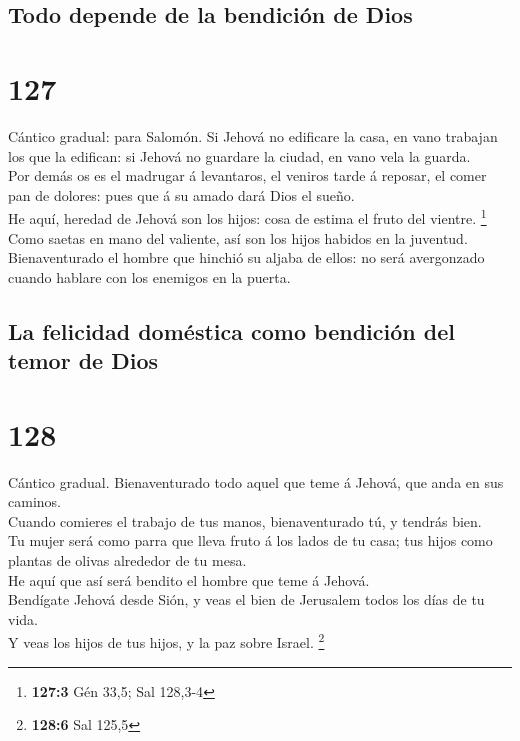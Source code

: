 \hypertarget{todo-depende-de-la-bendiciuxf3n-de-dios}{%
\subsection{Todo depende de la bendición de
Dios}\label{todo-depende-de-la-bendiciuxf3n-de-dios}}

\hypertarget{section-126}{%
\section{127}\label{section-126}}

 Cántico gradual: para Salomón. Si Jehová no edificare la
casa, en vano trabajan los que la edifican: si Jehová no guardare la
ciudad, en vano vela la guarda.\\
 Por demás os es el madrugar á levantaros, el veniros
tarde á reposar, el comer pan de dolores: pues que á su amado dará Dios
el sueño.\\
 He aquí, heredad de Jehová son los hijos: cosa de estima
el fruto del vientre. \footnote{\textbf{127:3} Gén 33,5; Sal 128,3-4}\\
 Como saetas en mano del valiente, así son los hijos
habidos en la juventud.\\
 Bienaventurado el hombre que hinchió su aljaba de ellos:
no será avergonzado cuando hablare con los enemigos en la puerta.

\hypertarget{la-felicidad-domuxe9stica-como-bendiciuxf3n-del-temor-de-dios}{%
\subsection{La felicidad doméstica como bendición del temor de
Dios}\label{la-felicidad-domuxe9stica-como-bendiciuxf3n-del-temor-de-dios}}

\hypertarget{section-127}{%
\section{128}\label{section-127}}

 Cántico gradual. Bienaventurado todo aquel que teme á
Jehová, que anda en sus caminos.\\
 Cuando comieres el trabajo de tus manos, bienaventurado
tú, y tendrás bien.\\
 Tu mujer será como parra que lleva fruto á los lados de
tu casa; tus hijos como plantas de olivas alrededor de tu mesa.\\
 He aquí que así será bendito el hombre que teme á
Jehová.\\
 Bendígate Jehová desde Sión, y veas el bien de Jerusalem
todos los días de tu vida.\\
 Y veas los hijos de tus hijos, y la paz sobre Israel.
\footnote{\textbf{128:6} Sal 125,5}

